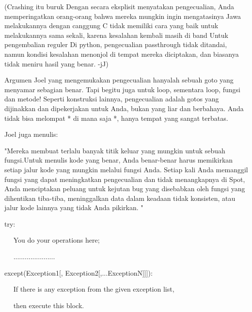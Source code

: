 \noindent 
\vspace{12pt}
\noindent 
(Crashing itu buruk Dengan secara eksplisit menyatakan pengecualian, Anda memperingatkan orang-orang bahwa mereka mungkin ingin mengatasinya Jawa melakukannya dengan canggung C tidak memiliki cara yang baik untuk melakukannya sama sekali, karena kesalahan kembali masih di band Untuk pengembalian reguler Di python, pengecualian passthrough tidak ditandai, namun kondisi kesalahan menonjol di tempat mereka diciptakan, dan biasanya tidak meniru hasil yang benar. -jJ) \par
\noindent 
 \hspace*{0.64in} Argumen Joel yang mengemukakan pengecualian hanyalah sebuah goto yang menyamar sebagian benar. Tapi begitu juga untuk loop, sementara loop, fungsi dan metode! Seperti konstruksi lainnya, pengecualian adalah gotos yang dijinakkan dan dipekerjakan untuk Anda, bukan yang liar dan berbahaya. Anda tidak bisa melompat * di mana saja *, hanya tempat yang sangat terbatas. \par
\noindent 
\vspace{12pt}
\noindent 
Joel juga menulis: \par
\noindent 
\vspace{12pt}
\noindent 
 \hspace*{0.64in} "Mereka membuat terlalu banyak titik keluar yang mungkin untuk sebuah fungsi.Untuk menulis kode yang benar, Anda benar-benar harus memikirkan setiap jalur kode yang mungkin melalui fungsi Anda. Setiap kali Anda memanggil fungsi yang dapat meningkatkan pengecualian dan tidak menangkapnya di Spot, Anda menciptakan peluang untuk kejutan bug yang disebabkan oleh fungsi yang dihentikan tiba-tiba, meninggalkan data dalam keadaan tidak konsisten, atau jalur kode lainnya yang tidak Anda pikirkan. " \par
\noindent 
\vspace{12pt}
\noindent 
\vspace{10pt}
\vspace{12pt}
\noindent 
try: \par
\noindent 
~~ You do your operations here; \par
\noindent 
~~ ...................... \par
\noindent 
except(Exception1[, Exception2[,...ExceptionN]]]): \par
\noindent 
~~ If there is any exception from the given exception list,  \par
\noindent 
~~ then execute this block. \par
